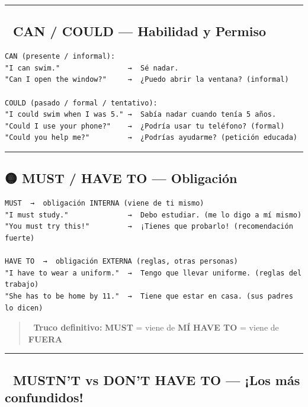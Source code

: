 \documentclass[
  spanish,
  letterpaper,
]{scrbook}
\begin{document}
\begin{center}\rule{0.5\linewidth}{0.5pt}\end{center}

\subsection{🔵 CAN / COULD --- Habilidad y
Permiso}\label{can-could-habilidad-y-permiso}

\begin{verbatim}
CAN (presente / informal):
"I can swim."                →  Sé nadar.
"Can I open the window?"     →  ¿Puedo abrir la ventana? (informal)

COULD (pasado / formal / tentativo):
"I could swim when I was 5." →  Sabía nadar cuando tenía 5 años.
"Could I use your phone?"    →  ¿Podría usar tu teléfono? (formal)
"Could you help me?"         →  ¿Podrías ayudarme? (petición educada)
\end{verbatim}

\begin{center}\rule{0.5\linewidth}{0.5pt}\end{center}

\subsection{🟡 MUST / HAVE TO ---
Obligación}\label{must-have-to-obligaciuxf3n}

\begin{verbatim}
MUST  →  obligación INTERNA (viene de ti mismo)
"I must study."              →  Debo estudiar. (me lo digo a mí mismo)
"You must try this!"         →  ¡Tienes que probarlo! (recomendación fuerte)

HAVE TO  →  obligación EXTERNA (reglas, otras personas)
"I have to wear a uniform."  →  Tengo que llevar uniforme. (reglas del trabajo)
"She has to be home by 11."  →  Tiene que estar en casa. (sus padres lo dicen)
\end{verbatim}

\begin{quote}
🧠 \textbf{Truco definitivo:} \textbf{MUST} = viene de \textbf{MÍ}
\textbf{HAVE TO} = viene de \textbf{FUERA}
\end{quote}

\begin{center}\rule{0.5\linewidth}{0.5pt}\end{center}

\subsection{🔴 MUSTN'T vs DON'T HAVE TO --- ¡Los más
confundidos!}\label{mustnt-vs-dont-have-to-los-muxe1s-confundidos}
\end{document}
